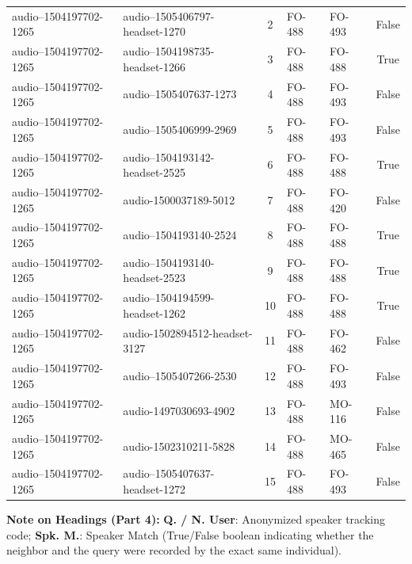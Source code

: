 {\begin{longtable}{ll c ll c}
audio--1504197702-1265 & audio--1505406797-headset-1270 & 2 & FO-488 & FO-493 & False \\
audio--1504197702-1265 & audio--1504198735-headset-1266 & 3 & FO-488 & FO-488 & True \\
audio--1504197702-1265 & audio--1505407637-1273 & 4 & FO-488 & FO-493 & False \\
audio--1504197702-1265 & audio--1505406999-2969 & 5 & FO-488 & FO-493 & False \\
audio--1504197702-1265 & audio--1504193142-headset-2525 & 6 & FO-488 & FO-488 & True \\
audio--1504197702-1265 & audio-1500037189-5012 & 7 & FO-488 & FO-420 & False \\
audio--1504197702-1265 & audio--1504193140-2524 & 8 & FO-488 & FO-488 & True \\
audio--1504197702-1265 & audio--1504193140-headset-2523 & 9 & FO-488 & FO-488 & True \\
audio--1504197702-1265 & audio--1504194599-headset-1262 & 10 & FO-488 & FO-488 & True \\
audio--1504197702-1265 & audio-1502894512-headset-3127 & 11 & FO-488 & FO-462 & False \\
audio--1504197702-1265 & audio--1505407266-2530 & 12 & FO-488 & FO-493 & False \\
audio--1504197702-1265 & audio-1497030693-4902 & 13 & FO-488 & MO-116 & False \\
audio--1504197702-1265 & audio-1502310211-5828 & 14 & FO-488 & MO-465 & False \\
audio--1504197702-1265 & audio--1505407637-headset-1272 & 15 & FO-488 & FO-493 & False \\
\bottomrule
\end{longtable}
}
\vspace{0.1cm}
{\footnotesize\noindent\raggedright \textbf{Note on Headings (Part 4):} \textbf{Q. / N. User}: Anonymized speaker tracking code; \textbf{Spk. M.}: Speaker Match (True/False boolean indicating whether the neighbor and the query were recorded by the exact same individual).\par}

